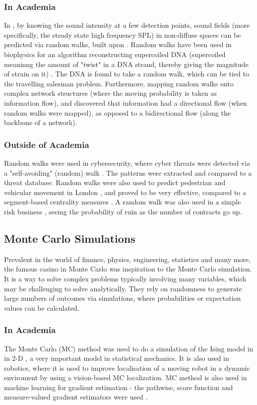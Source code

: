 \documentclass[10pt, twocolumn]{article}
\begin{document}
\subsubsection{In Academia} %
In \cite{Kruzins1982}, by knowing the sound intensity at a few detection points, sound fields (more specifically, the steady state high frequency SPL) in non-diffuse spaces can be predicted via random walks, built upon \cite{Gerlach1975}. Random walks have been used in biophysics for an algorithm reconstructing supercoiled DNA \cite{Baba2020} (supercoiled meaninng the amount of "twist" in a DNA strand, thereby giving the magnitude of strain on it) \cite{Bauer1980}. The DNA is found to take a random walk, which can be tied to the travelling salesman problem. Furthermore, mapping random walks onto complex network structures (where the moving probability is taken as information flow), and \cite{Noh2004} discovered that information had a directional flow (when random walks were mapped), as opposed to a bidirectional flow (along the backbone of a network). 

\subsubsection{Outside of Academia} %
Random walks were used in cybersecurity, where cyber threats were detected via a "self-avoiding" (random) walk \cite{Nia2016}. The patterns were extracted and compared to a threat database. Random walks were also used to predict pedestrian and vehicular movement in London \cite{Hanna2021}, and proved to be very effective, compared to a segment-based centrality measures \cite{Jayasinghe2015}. A random walk was also used in a simple risk business \cite{Seal1966}, seeing the probability of ruin as the number of contracts go up.

\subsection{Monte Carlo Simulations} %
Prevalent in the world of finance, physics, engineering, statistics and many more, the famous casino in Monte Carlo was inspiration to the Monte Carlo simulation. It is a way to solve complex problems typically involving many variables, which may be challenging to solve analytically. They rely on randomness to generate large numbers of outcomes via simulations, where probabilities or expectation values can be calculated.

\subsubsection{In Academia} %
The Monte Carlo (MC) method was used to do a simulation of the Ising model in in 2-D \cite{Shekaari2021}\cite{Jindal2007}, a very important model in statistical mechanics. It is also used in robotics, where it is used to improve localisation of a moving robot in a dynamic enviroment \cite{Zhao2008} by using a vision-based MC localization. MC method is also used in machine learning for gradient estimation - the pathwise, score function and measure-valued gradient estimators were used \cite{Mohamed2020}.
\end{document}

